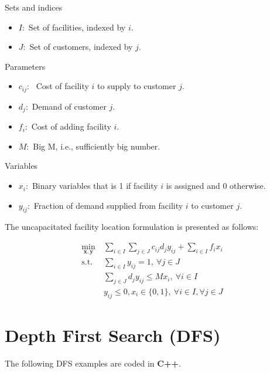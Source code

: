 \documentclass[10pt,bezier]{article}
\begin{document}
\noindent Sets and indices
\begin{itemize}
  \item $I$:~Set of facilities, indexed by $i$.
  \item $J$:~Set of customers, indexed by $j$.
\end{itemize}
Parameters
\begin{itemize}
    \item $c_{ij}$:~ Cost of facility $i$ to supply to customer $j$.
    \item $d_j$:~Demand of customer $j$.
    \item $f_i$:~Cost of adding facility $i$.
    \item $M$:~Big M, i.e., sufficiently big number.
\end{itemize}
Variables
\begin{itemize}
  \item $x_i$:~Binary variables that is 1 if facility $i$ is assigned and 0 otherwise.
  \item $y_{ij}$:~Fraction of demand supplied from facility $i$ to customer $j$.
\end{itemize}

\noindent The uncapacitated facility location formulation is presented as follows:

\begin{subequations}
    \begin{align}
    \min_{\pmb{x},\pmb{y}}~& \sum_{i \in I} \sum_{ j \in J} c_{ij} d_j y_{ij} + \sum_{i \in I} f_i x_i  \tag{Minimize total cost}\\
    \text{s.t. } & \sum_{i \in I} y_{ij} = 1,~\forall j \in J \tag{2.2a - Satisfied fraction of demand}\\
                 & \sum_{j \in J} d_j y_{ij} \leq M x_i,~\forall i \in I \tag{2.2b - Uncapacitated facility}\\
                 & y_{ij} \leq 0, x_i \in \{0,1\},~\forall i \in I, \forall j \in J  \tag{2.2c - Domain}
    \end{align}
\end{subequations}


\newpage
\section{Depth First Search (DFS)}\label{section3}
The following DFS examples are coded in {\color{blue}\textbf{C++}}.
\end{document}
